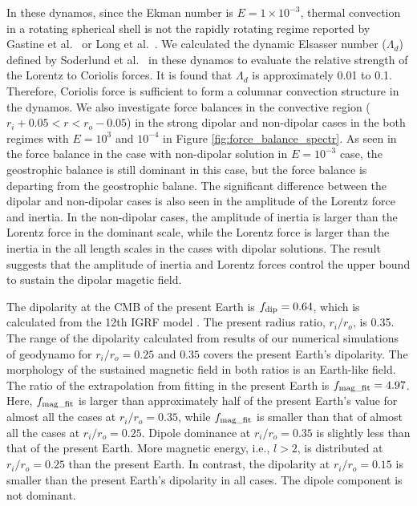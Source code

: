 {\color{red}
In these dynamos, since the Ekman number is $E = 1 \times 10^{-3}$, thermal convection in a rotating spherical shell is not the rapidly rotating regime reported by Gastine et al.\   or Long et al.\ . 
We calculated the dynamic Elsasser number ($\Lambda_d$) defined by Soderlund et al.\  in these dynamos to evaluate the relative strength of the Lorentz to Coriolis forces. 
It is found that $\Lambda_d$ is approximately 0.01 to 0.1. 
Therefore, Coriolis force is sufficient to form a columnar convection structure in the dynamos.
}
{\color{blue}
We also investigate force balances in the convective region ($r_{i} + 0.05 < r < r_{o} - 0.05$) in the strong dipolar and non-dipolar cases in the both regimes with $E = 10^{3}$ and $10^{-4}$ in Figure \ref{fig:force_balance_spectr}. As seen in the force balance in the case with non-dipolar solution in $E = 10^{-3}$ case, the geostrophic balance is still dominant in this case, but the force balance is departing from the geostrophic balane.  The significant difference between the dipolar and non-dipolar cases is also seen in the amplitude of the Lorentz force and inertia. In the non-dipolar cases, the amplitude of inertia is larger than the Lorentz force in the dominant scale, while the Lorentz force is larger than the inertia in the all length scales in the cases with dipolar solutions. The result suggests that the amplitude of inertia and Lorentz forces control the upper bound to sustain the dipolar magetic field.
}

The dipolarity at the CMB of the present Earth is $f_{\rm dip} = 0.64$, which is calculated from the 12th IGRF model \cite{Thebault:2015}. 
The present radius ratio, $r_i/r_o$, is 0.35. 
The range of the dipolarity calculated from results of our numerical simulations of geodynamo for $r_i/r_o  = 0.25$ and $0.35$ covers the present Earth's dipolarity. 
The morphology of the sustained magnetic field in both ratios is an Earth-like field. 
The ratio of the extrapolation from fitting in the present Earth is $f_{\rm mag\_fit} = 4.97$. 
Here, $f_{\rm mag\_fit}$ is larger than approximately half of the present Earth's value for almost all the cases at $r_i/r_o = 0.35$, while $f_{\rm mag\_fit}$ is smaller than that of almost all the cases at $r_i/r_o = 0.25$. 
Dipole dominance at $r_i/r_o = 0.35$ is slightly less than that of the present Earth. 
More magnetic energy, i.e., $l > 2$, is distributed at $r_i/r_o = 0.25$ than the present Earth. 
In contrast, the dipolarity at $r_i/r_o = 0.15$ is smaller than the present Earth's dipolarity in all cases. 
The dipole component is not dominant.

